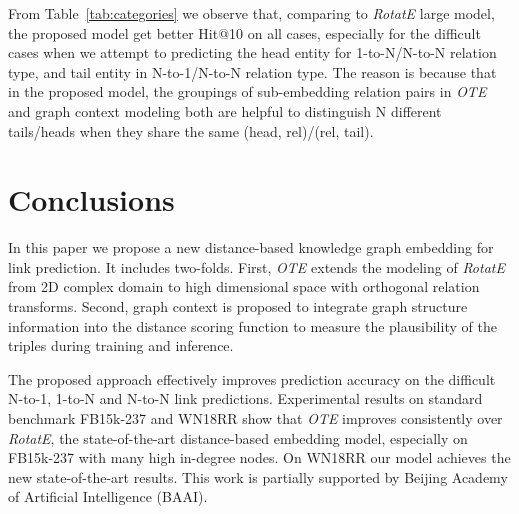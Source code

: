 \documentclass[11pt,a4paper]{article}
\begin{document}
From Table~\ref{tab:categories} we observe that, comparing to \textit{RotatE} large model, the proposed model get better Hit@10 on all cases, especially for the difficult cases when we attempt to predicting the head entity for 1-to-N/N-to-N relation type, and tail entity in N-to-1/N-to-N relation type. The reason is because that in the proposed model, the groupings of sub-embedding relation pairs in {\it OTE} and graph context modeling both are helpful to distinguish N different tails/heads when they share the same (head, rel)/(rel, tail). 







\section{Conclusions}
In this paper we propose a new distance-based knowledge graph embedding for link prediction. It includes two-folds. First, {\it OTE} extends the modeling of {\it RotatE} from 2D complex domain to high dimensional space with orthogonal relation transforms. Second, graph context is proposed to integrate graph structure information into the distance scoring function to measure the plausibility of the triples during training and inference.





The proposed 
approach effectively improves prediction accuracy on the difficult N-to-1, 1-to-N and N-to-N link predictions. 
Experimental results on standard benchmark FB15k-237 and WN18RR show that {\it OTE} improves consistently over {\it RotatE}, the state-of-the-art distance-based embedding model, especially on FB15k-237 with many high in-degree nodes. On WN18RR our model achieves the new state-of-the-art results. This work is partially supported by Beijing Academy of Artificial Intelligence (BAAI).
\end{document}
